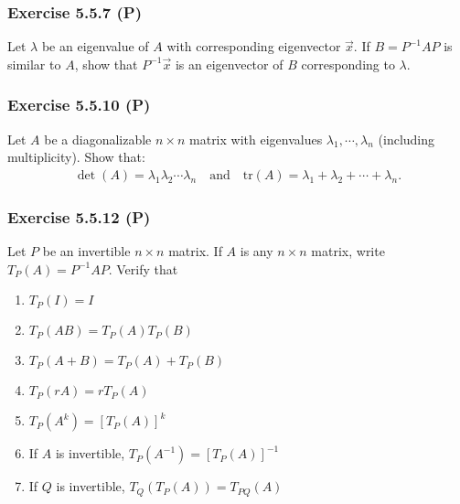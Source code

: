 \documentclass[pdf,9pt,t]{beamer}
\begin{document}
\begin{frame}[fragile]
    \frametitle{Exercise 5.5.7  (P)}
    \begin{problem}
	Let $\lambda$ be an eigenvalue of $A$ with corresponding eigenvector $\vec{x}$. If $B=P^{-1}AP$ is similar  to $A$,
	show that $P^{-1}\vec{x}$ is an eigenvector of $B$ corresponding to $\lambda$.
    \end{problem}

\end{frame}
\begin{frame}[fragile]
    \frametitle{Exercise 5.5.10 (P)}
    \begin{problem}
	Let $A$ be a diagonalizable $n\times n$ matrix with eigenvalues $\lambda_1,\cdots,\lambda_n$ (including multiplicity).
	Show that:
	\begin{align*}
	    \det(A) = \lambda_1\lambda_2\cdots\lambda_n\quad\text{and}\quad
	    \text{tr}(A) = \lambda_1+\lambda_2+\cdots+\lambda_n.
	\end{align*}
    \end{problem}

\end{frame}
\begin{frame}[fragile]
    \frametitle{Exercise 5.5.12 (P)}
    \begin{problem}
	Let $P$ be an invertible $n\times n$ matrix. If $A$ is any $n \times n$ matrix, write $T_P(A) = P^{-1}AP$. Verify that
	\begin{enumerate}
	    \item $T_P(I)=I$
	    \item $T_P(AB)=T_P(A)T_P(B)$
	    \item $T_P(A+B)=T_P(A)+T_P(B)$
	    \item $T_P(rA)=rT_P(A)$
	    \item $T_P(A^k)=\left[T_P(A)\right]^k$
	    \item If $A$ is invertible, $T_P(A^{-1})=\left[T_P(A)\right]^{-1}$
	    \item If $Q$ is invertible, $T_Q(T_P(A))=T_{PQ}(A)$
	\end{enumerate}
    \end{problem}
\end{frame}
\end{document}

